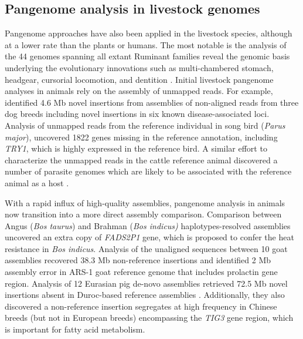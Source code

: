 \documentclass[../main.tex]{subfiles}
\begin{document}
\subsection{Pangenome analysis in livestock genomes}

Pangenome approaches have also been applied in the livestock species, although at a lower rate than the plants or humans. The most notable is the analysis of the 44 genomes spanning all extant Ruminant families reveal the genomic basis underlying the evolutionary innovations such as multi-chambered stomach, headgear, cursorial locomotion, and dentition \citep{chen2019large}. Initial livestock pangenome analyses in animals rely on the assembly of unmapped reads. For example, \citet{holden2018assembly} identified 4.6 Mb novel insertions from assemblies of non-aligned reads from three dog breeds including  novel insertions in six known disease-associated loci. Analysis of unmapped reads from the reference individual in song bird (\emph{Parus major}), \citet{laine2019exploring} uncovered 1822 genes missing in the reference annotation, including \emph{TRY1}, which is highly expressed in the reference bird. A similar effort to characterize the unmapped reads in the cattle reference animal discovered a number of parasite genomes which are likely to be associated with the reference animal as a host \citep{whitacre2015s}. 

With a rapid influx of high-quality assemblies, pangenome analysis in animals now transition into a more direct assembly comparison. Comparison between Angus (\emph{Bos taurus}) and Brahman (\emph{Bos indicus)} haplotypes-resolved assemblies \citep{Low2020} uncovered an extra copy of \emph{FADS2P1} gene, which is proposed to confer the heat resistance in \emph{Bos indicus}. Analysis of the unaligned sequences between 10 goat assemblies \citep{li2019towards} recovered 38.3 Mb non-reference insertions and identified 2 Mb assembly error in ARS-1 goat reference genome that includes prolactin gene region. Analysis of 12 Eurasian pig de-novo assemblies retrieved 72.5 Mb novel insertions absent in Duroc-based reference assemblies \citep{li2017comprehensive,tian2019building}. Additionally, they also discovered a non-reference insertion segregates at high frequency in Chinese breeds (but not in European breeds) encompassing the \emph{TIG3} gene region, which is important for fatty acid metabolism. 




\singlespacing
\footnotesize



% 




\ifdefined\BuildingFromMainFile
\else
   
\end{document}
